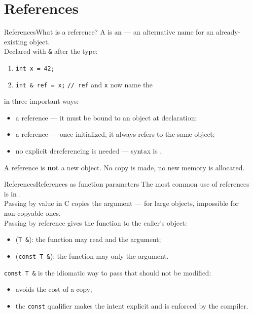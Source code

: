 
\section{References}
\graphicspath{{figs/section5/}}

\begin{frame}{References}{What is a reference?}
	\justifying
	A  is an  — an alternative name for an already-existing object.\\
	\bigskip
	Declared with \texttt{\&} after the type:
	\begin{enumerate}
		\item \texttt{int x = 42;}
		\item \texttt{int \& ref = x;} \texttt{// ref} and \texttt{x} now name the 
	\end{enumerate}
	\bigskip
	 in three important ways:
	\begin{itemize}
		\item a reference  — it must be bound to an object at declaration;
		\item a reference  — once initialized, it always refers to the same object;
		\item no explicit dereferencing is needed — syntax is .
	\end{itemize}
	\bigskip
	\begin{block}{}
		\centering
		A reference is \textbf{not} a new object. No copy is made, no new memory is allocated.
	\end{block}
\end{frame}
\begin{frame}{References}{References as function parameters}
	\justifying
	The most common use of references is in .\\
	\bigskip
	Passing by value in C copies the argument —  for large objects, impossible for non-copyable ones.\\
	\bigskip
	Passing by reference gives the function  to the caller's object:
	\begin{itemize}
		\item {} (\texttt{T \&}): the function may read and  the argument;
		\item {} (\texttt{const T \&}): the function may only  the argument.
	\end{itemize}
	\bigskip
	\texttt{const T \&} is the idiomatic way to pass  that should not be modified:
	\begin{itemize}
		\item avoids the cost of a copy;
		\item the \texttt{const} qualifier makes the intent explicit and is enforced by the compiler.
	\end{itemize}
\end{frame}

